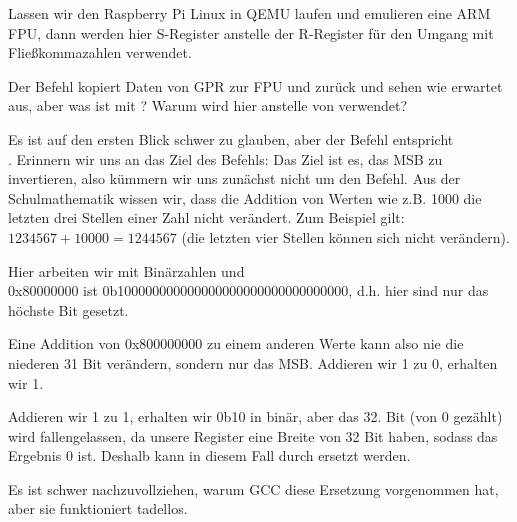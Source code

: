 

Lassen wir den Raspberry Pi Linux in QEMU laufen und emulieren eine ARM FPU,
dann werden hier S-Register anstelle der R-Register für den Umgang mit
Fließkommazahlen verwendet.

Der Befehl \FMRS kopiert Daten von \ac{GPR} zur FPU und zurück
 und  sehen wie erwartet aus, aber was ist mit
? Warum wird hier \ADD anstelle von \XOR verwendet?

Es ist auf den ersten Blick schwer zu glauben, aber der Befehl  entspricht\\
.
Erinnern wir uns an das Ziel des Befehls: Das Ziel ist es, das \ac{MSB} zu
invertieren, also kümmern wir uns zunächst nicht um den \XOR Befehl.
Aus der Schulmathematik wissen wir, dass die Addition von Werten wie z.B. 1000
die letzten drei Stellen einer Zahl nicht verändert.
Zum Beispiel gilt: $1234567 + 10000 = 1244567$ (die letzten vier Stellen können
sich nicht verändern).

Hier arbeiten wir mit Binärzahlen und \\
0x80000000 ist 0b100000000000000000000000000000000, d.h. hier sind nur das
höchste Bit gesetzt. 

Eine Addition von 0x800000000 zu einem anderen Werte kann also nie die niederen
31 Bit verändern, sondern nur das \ac{MSB}.
Addieren wir 1 zu 0, erhalten wir 1.

Addieren wir 1 zu 1, erhalten wir 0b10 in binär, aber das 32. Bit (von 0
gezählt) wird fallengelassen, da unsere Register eine Breite von 32 Bit haben,
sodass das Ergebnis 0 ist.
Deshalb kann in diesem Fall \XOR durch \ADD ersetzt werden.

Es ist schwer nachzuvollziehen, warum GCC diese Ersetzung vorgenommen hat, aber
sie funktioniert tadellos.
